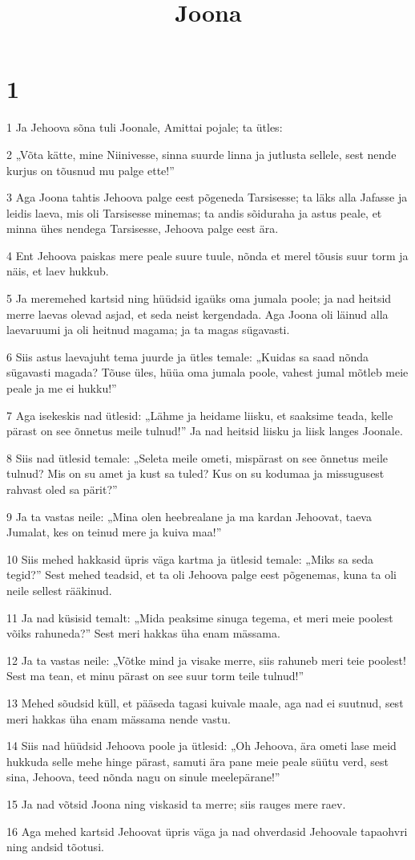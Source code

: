 

\title{Joona}

\chapter{1}

\par 1 Ja Jehoova sõna tuli Joonale, Amittai pojale; ta ütles:
\par 2 „Võta kätte, mine Niinivesse, sinna suurde linna ja jutlusta sellele, sest nende kurjus on tõusnud mu palge ette!”
\par 3 Aga Joona tahtis Jehoova palge eest põgeneda Tarsisesse; ta läks alla Jafasse ja leidis laeva, mis oli Tarsisesse minemas; ta andis sõiduraha ja astus peale, et minna ühes nendega Tarsisesse, Jehoova palge eest ära.
\par 4 Ent Jehoova paiskas mere peale suure tuule, nõnda et merel tõusis suur torm ja näis, et laev hukkub.
\par 5 Ja meremehed kartsid ning hüüdsid igaüks oma jumala poole; ja nad heitsid merre laevas olevad asjad, et seda neist kergendada. Aga Joona oli läinud alla laevaruumi ja oli heitnud magama; ja ta magas sügavasti.
\par 6 Siis astus laevajuht tema juurde ja ütles temale: „Kuidas sa saad nõnda sügavasti magada? Tõuse üles, hüüa oma jumala poole, vahest jumal mõtleb meie peale ja me ei hukku!”
\par 7 Aga isekeskis nad ütlesid: „Lähme ja heidame liisku, et saaksime teada, kelle pärast on see õnnetus meile tulnud!” Ja nad heitsid liisku ja liisk langes Joonale.
\par 8 Siis nad ütlesid temale: „Seleta meile ometi, mispärast on see õnnetus meile tulnud? Mis on su amet ja kust sa tuled? Kus on su kodumaa ja missugusest rahvast oled sa pärit?”
\par 9 Ja ta vastas neile: „Mina olen heebrealane ja ma kardan Jehoovat, taeva Jumalat, kes on teinud mere ja kuiva maa!”
\par 10 Siis mehed hakkasid üpris väga kartma ja ütlesid temale: „Miks sa seda tegid?” Sest mehed teadsid, et ta oli Jehoova palge eest põgenemas, kuna ta oli neile sellest rääkinud.
\par 11 Ja nad küsisid temalt: „Mida peaksime sinuga tegema, et meri meie poolest võiks rahuneda?” Sest meri hakkas üha enam mässama.
\par 12 Ja ta vastas neile: „Võtke mind ja visake merre, siis rahuneb meri teie poolest! Sest ma tean, et minu pärast on see suur torm teile tulnud!”
\par 13 Mehed sõudsid küll, et pääseda tagasi kuivale maale, aga nad ei suutnud, sest meri hakkas üha enam mässama nende vastu.
\par 14 Siis nad hüüdsid Jehoova poole ja ütlesid: „Oh Jehoova, ära ometi lase meid hukkuda selle mehe hinge pärast, samuti ära pane meie peale süütu verd, sest sina, Jehoova, teed nõnda nagu on sinule meelepärane!”
\par 15 Ja nad võtsid Joona ning viskasid ta merre; siis rauges mere raev.
\par 16 Aga mehed kartsid Jehoovat üpris väga ja nad ohverdasid Jehoovale tapaohvri ning andsid tõotusi.

